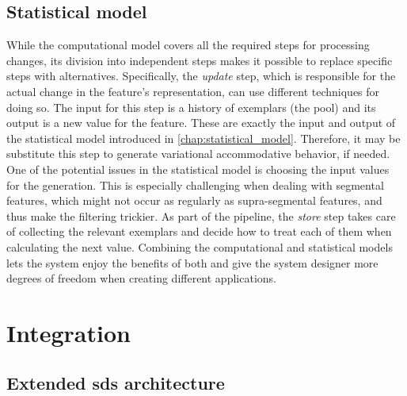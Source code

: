\subsection{Statistical model}
\label{subsec:statistical_model}

While the computational model covers all the required steps for processing changes, its division into independent steps makes it possible to replace specific steps with alternatives.
Specifically, the \emph{update} step, which is responsible for the actual change in the feature's representation, can use different techniques for doing so.
The input for this step is a history of exemplars (the pool) and its output is a new value for the feature.
These are exactly the input and output of the statistical model introduced in \cref{chap:statistical_model}.
Therefore, it may be substitute this step to generate variational accommodative behavior, if needed.
One of the potential issues in the statistical model is choosing the input values for the generation.
This is especially challenging when dealing with segmental features, which might not occur as regularly as supra-segmental features, and thus make the filtering trickier.
As part of the pipeline, the \emph{store} step takes care of collecting the relevant exemplars and decide how to treat each of them when calculating the next value.
Combining the computational and statistical models lets the system enjoy the benefits of both and give the system designer more degrees of freedom when creating different applications.

\section{Integration}
\label{sec:integration}

\subsection{Extended \acl{sds} architecture}
\label{subsec:extended_sds}

